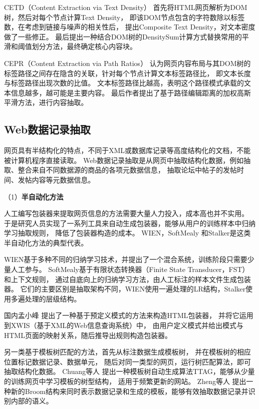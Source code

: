CETD（Content Extraction via Text Density）
首先将HTML网页解析为DOM树，然后对每个节点计算Text Density，
即该DOM节点包含的字符数除以标签数，在考虑到链接与噪声的相关性后，
提出Composite Text Density，对文本密度做了一些修正。
最后提出一种结合DOM树的DensitySum计算方式替换常用的平滑和阈值划分方法，最终确定核心内容块。

CEPR（Content Extraction via Path Ratios）
认为网页内容布局与其DOM树的标签路径之间存在隐含的关联，针对每个节点计算文本标签路径比，
即文本长度与标签路径出现次数的比值。
文本标签路径比越高，表明这个路径模式承载的文本信息越多，越可能是主要内容。
最后作者提出了基于路径编辑距离的加权高斯平滑方法，进行内容抽取。

\subsection{Web数据记录抽取}
网页具有半结构化的特点，不同于XML或数据库记录等高度结构化的文档，不能被计算机程序直接读取。
Web数据记录抽取是从网页中抽取结构化数据，例如抽取、整合来自不同数据源的商品的各项元数据信息，
抽取论坛中帖子的发帖时间、发帖内容等元数据信息。

（1）\textbf{半自动化方法}

人工编写包装器来提取网页信息的方法需要大量人力投入，成本高也并不实用。
于是研究人员实现了一系列工具来自动生成包装器，能够从用户的训练样本中归纳学习抽取规则，
降低了包装器构造的成本。
WIEN，SoftMealy
和Stalker是这类半自动化方法的典型代表。

WIEN基于多种不同的归纳学习技术，并提出了一个混合系统，训练阶段只需要少量人工参与。
SoftMealy基于有限状态转换器（Finite State Transducer，FST）和上下文规则，
通过自底向上的归纳学习方法，由人工标注的样本文件生成包装器。
它们的主要区别是抽取架构不同，WIEN使用一遍处理的LR结构，Stalker使用多遍处理的层级结构。

国内孟小峰
提出了一种基于预定义模式的方法来构造HTML包装器，
并将它运用到XWIS（基于XML的Web信息查询系统）中，
由用户定义模式并给出模式与HTML页面的映射关系，随后推导出规则构造包装器。

另一类基于模板树匹配的方法，首先从标注数据生成模板树，
并在模板树的相应位置标记数据记录、数据单元，
随后对同一类型的网页，运行树匹配算法，即可抽取结构化数据。
Chuang等人
提出一种模板树自动生成算法TTAG，能够从少量的训练网页中学习模板的树型结构，
适用于频繁更新的网站。
Zheng等人
提出一种新的Broom结构来同时表示数据记录和生成的模板，能够有效抽取数据记录并识别内部的语义。

